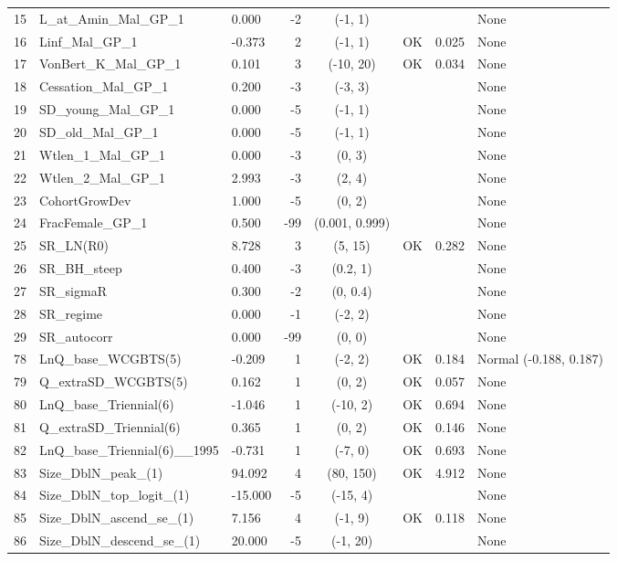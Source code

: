 \documentclass[12pt,]{article}
\begin{document}
\begin{landscape}
\begin{longtable}{lp{2.5in}lrcccl}
  15 & L\_at\_Amin\_Mal\_GP\_1 & 0.000 & -2 & (-1, 1) &  &  & None \\ 
  16 & Linf\_Mal\_GP\_1 & -0.373 & 2 & (-1, 1) & OK & 0.025 & None \\ 
  17 & VonBert\_K\_Mal\_GP\_1 & 0.101 & 3 & (-10, 20) & OK & 0.034 & None \\ 
  18 & Cessation\_Mal\_GP\_1 & 0.200 & -3 & (-3, 3) &  &  & None \\ 
  19 & SD\_young\_Mal\_GP\_1 & 0.000 & -5 & (-1, 1) &  &  & None \\ 
  20 & SD\_old\_Mal\_GP\_1 & 0.000 & -5 & (-1, 1) &  &  & None \\ 
  21 & Wtlen\_1\_Mal\_GP\_1 & 0.000 & -3 & (0, 3) &  &  & None \\ 
  22 & Wtlen\_2\_Mal\_GP\_1 & 2.993 & -3 & (2, 4) &  &  & None \\ 
  23 & CohortGrowDev & 1.000 & -5 & (0, 2) &  &  & None \\ 
  24 & FracFemale\_GP\_1 & 0.500 & -99 & (0.001, 0.999) &  &  & None \\ 
  25 & SR\_LN(R0) & 8.728 & 3 & (5, 15) & OK & 0.282 & None \\ 
  26 & SR\_BH\_steep & 0.400 & -3 & (0.2, 1) &  &  & None \\ 
  27 & SR\_sigmaR & 0.300 & -2 & (0, 0.4) &  &  & None \\ 
  28 & SR\_regime & 0.000 & -1 & (-2, 2) &  &  & None \\ 
  29 & SR\_autocorr & 0.000 & -99 & (0, 0) &  &  & None \\ 
  78 & LnQ\_base\_WCGBTS(5) & -0.209 & 1 & (-2, 2) & OK & 0.184 & Normal (-0.188, 0.187) \\ 
  79 & Q\_extraSD\_WCGBTS(5) & 0.162 & 1 & (0, 2) & OK & 0.057 & None \\ 
  80 & LnQ\_base\_Triennial(6) & -1.046 & 1 & (-10, 2) & OK & 0.694 & None \\ 
  81 & Q\_extraSD\_Triennial(6) & 0.365 & 1 & (0, 2) & OK & 0.146 & None \\ 
  82 & LnQ\_base\_Triennial(6)\_\_1995 & -0.731 & 1 & (-7, 0) & OK & 0.693 & None \\ 
  83 & Size\_DblN\_peak\_(1) & 94.092 & 4 & (80, 150) & OK & 4.912 & None \\ 
  84 & Size\_DblN\_top\_logit\_(1) & -15.000 & -5 & (-15, 4) &  &  & None \\ 
  85 & Size\_DblN\_ascend\_se\_(1) & 7.156 & 4 & (-1, 9) & OK & 0.118 & None \\ 
  86 & Size\_DblN\_descend\_se\_(1) & 20.000 & -5 & (-1, 20) &  &  & None \\ 

\end{longtable}
\end{landscape}
\end{document}
